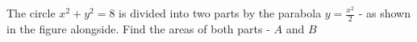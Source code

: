 
%
%
%
%
% 
% 

\question[4] The circle $x^2+y^2=8$ is divided into two parts by the parabola 
$y=\frac{x^2}{2}$ - as shown in the figure alongside. Find the areas of both parts - $A$ and $B$


